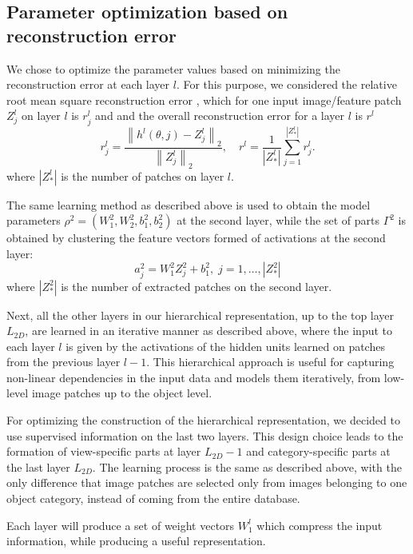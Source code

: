 \documentclass[runningheads]{llncs}
\begin{document}
\subsection{Parameter optimization based on reconstruction error}

We chose to optimize the parameter values based on minimizing the reconstruction error at each layer $l$. For this purpose, we considered the relative root mean square reconstruction error \cite{Chai2014}, which for one input image/feature patch $Z_j^l$ on layer $l$ is $r_j^l$ and and the overall reconstruction error for a layer $l$ is $r^l$
\begin{equation}
  r_j^l = \frac{\left\|h^l(\theta,j)-Z_j^l\right\|_2}{\left\|Z_j^l\right\|_2},\quad
   r^l = \frac{1}{|Z_*^l|} \sum_{j=1}^{|Z_*^l|} r_j^l.
  \label{eqn:recon-error.patch}
\end{equation}
where $|Z_*^l|$ is the number of patches on layer $l$.

The same learning method as described above is used to obtain the model parameters $\rho^2=(W_1^2,W_2^2,b_1^2,b_2^2)$ at the second layer, while the set of parts $\Gamma^{2}$ is obtained by clustering the feature vectors formed of activations at the second layer:
\begin{equation}
a_j^2=W_1^2Z_j^2+b_1^2, \;j=1,\ldots,|Z_*^2|
\end{equation}
where $|Z_*^2|$ is the number of extracted patches on the second layer.

Next, all the other layers in our hierarchical representation, up to the top layer $L_{2D}$, are learned in an iterative manner as described above, where the input to each layer $l$ is given by the activations of the hidden units learned on patches from the previous layer $l-1$. This hierarchical approach is useful for capturing non-linear dependencies in the input data and models them iteratively, from low-level image patches up to the object level.

For optimizing the construction of the hierarchical representation, we decided to use supervised information on the last two layers. This design choice leads to the formation of view-specific parts at layer $L_{2D}-1$ and category-specific parts at the last layer $L_{2D}$. The learning process is the same as described above, with the only difference that image patches are selected only from images belonging to one object category, instead of coming from the entire database.    

Each layer will produce a set of weight vectors $W_1^l$ which compress the input information, while producing a useful representation. 
\end{document}
